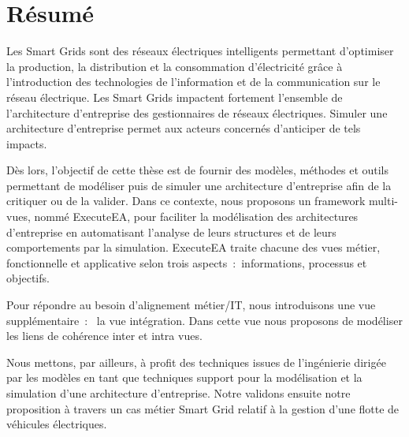 \chapter*{Résumé}

Les Smart Grids sont des réseaux électriques intelligents permettant d’optimiser la
production, la distribution et la consommation d’électricité grâce à l’introduction des
technologies de l’information et de la communication sur le réseau électrique. Les Smart
Grids impactent fortement l’ensemble de l’architecture d’entreprise des gestionnaires de
réseaux électriques. Simuler une architecture d’entreprise permet aux acteurs concernés
d’anticiper de tels impacts.

Dès lors, l’objectif de cette thèse est de fournir des modèles, méthodes et outils permettant de
modéliser puis de simuler une architecture d’entreprise afin de la critiquer ou de la valider.
Dans ce contexte, nous proposons un framework multi-vues, nommé ExecuteEA, pour
faciliter la modélisation des architectures d’entreprise en automatisant l’analyse de leurs
structures et de leurs comportements par la simulation. ExecuteEA traite chacune des vues
métier, fonctionnelle et applicative selon trois aspects~:~informations, processus et objectifs.

Pour répondre au besoin d’alignement métier/IT, nous introduisons une vue supplémentaire~:~
la vue intégration. Dans cette vue nous proposons de modéliser les liens de cohérence inter et
intra vues.

Nous mettons, par ailleurs, à profit des techniques issues de l’ingénierie dirigée par les modèles
en tant que techniques support pour la modélisation et la simulation d’une architecture
d’entreprise. Notre validons ensuite notre proposition à travers un cas métier Smart Grid
relatif à la gestion d’une flotte de véhicules électriques.